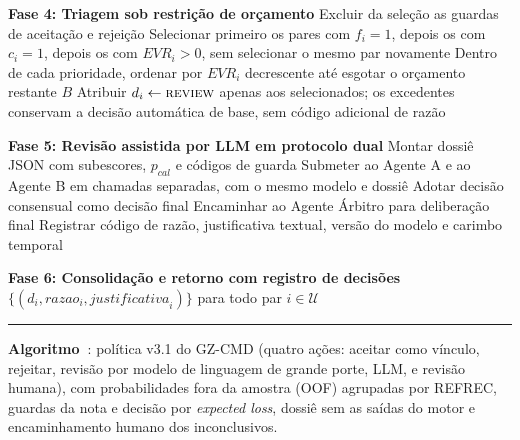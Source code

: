 \begin{algorithmic}[1]
\medskip
\STATE \textbf{Fase 4: Triagem sob restrição de orçamento}
\STATE Excluir da seleção as guardas de aceitação e rejeição
\STATE Selecionar primeiro os pares com $f_i=1$, depois os com $c_i=1$, depois os com $\mathit{EVR}_i>0$, sem selecionar o mesmo par novamente
\STATE Dentro de cada prioridade, ordenar por $\mathit{EVR}_i$ decrescente até esgotar o orçamento restante $B$
\STATE Atribuir $d_i\leftarrow\textsc{review}$ apenas aos selecionados; os excedentes conservam a decisão automática de base, sem código adicional de razão

\medskip
\STATE \textbf{Fase 5: Revisão assistida por LLM em protocolo dual}
    \STATE Montar dossiê JSON com subescores, $p_{\mathit{cal}}$ e códigos de guarda 
    \STATE Submeter ao Agente A e ao Agente B em chamadas separadas, com o mesmo modelo e dossiê
        \STATE Adotar decisão consensual como decisão final
    \ELSE
        \STATE Encaminhar ao Agente Árbitro para deliberação final
    \ENDIF
    \STATE Registrar código de razão, justificativa textual, versão do modelo e carimbo temporal
\ENDFOR

\medskip
\STATE \textbf{Fase 6: Consolidação e retorno com registro de decisões}
\RETURN $\{(d_i, \mathit{razao}_i, \mathit{justificativa}_i)\}$ para todo par $i \in \mathcal{U}$

\end{algorithmic}
\noindent\rule{\textwidth}{0.4pt}

\bigskip
%
\noindent\textbf{Algoritmo~\thealgorithm}: política v3.1 do GZ-CMD (quatro ações: aceitar como vínculo, rejeitar, revisão por modelo de linguagem de grande porte, LLM, e revisão humana), com probabilidades fora da amostra (OOF) agrupadas por REFREC, guardas da nota e decisão por \textit{expected loss}, dossiê sem as saídas do motor e encaminhamento humano dos inconclusivos.
\label{alg:gzcmd-v31}


